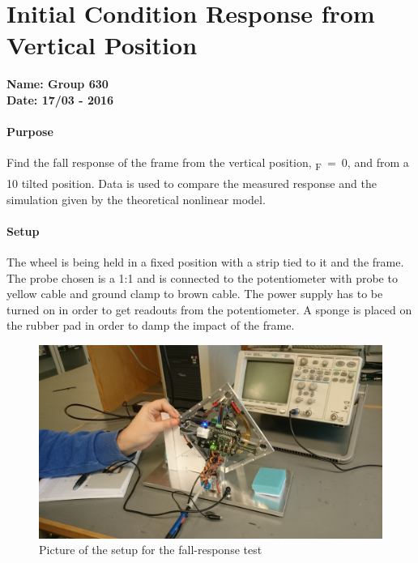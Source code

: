 \chapter{Initial Condition Response from Vertical Position}\label{fallResponseAppendix} 
\textbf{Name: Group 630}\\
\textbf{Date: 17/03 - 2016}

\subsubsection{Purpose}
Find the fall response of the frame from the vertical position, \si{\theta_F=0}, and from a \si{10^\circ} tilted position.
Data is used to compare the measured response and the simulation given by the theoretical nonlinear model.


\subsubsection{Setup}
The wheel is being held in a fixed position with a strip tied to it and the frame. The probe chosen is a 1:1 and is connected to the potentiometer with probe to yellow cable and ground clamp to brown cable. The power supply has to be turned on in order to get readouts from the potentiometer. A sponge is placed on the rubber pad in order to damp the impact of the frame.
\begin{figure}[H]                                   
	\centering                                        
	\includegraphics[scale=0.08]{figures/stepResponseSetup}
	\caption{Picture of the setup for the fall-response test}
	\label{stepResponseTestPicture} 
\end{figure}              

